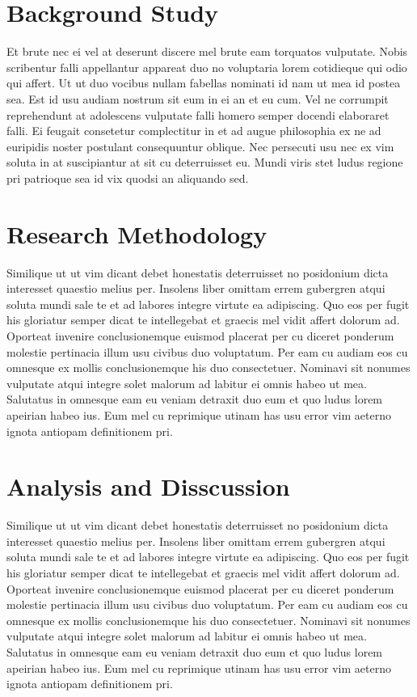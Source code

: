 \documentclass[twocolumn]{report}
\begin{document}
\section{Background Study}
Et brute nec ei vel at deserunt discere mel brute eam torquatos vulputate. Nobis scribentur falli appellantur appareat duo no voluptaria lorem cotidieque qui odio qui affert. Ut ut duo vocibus nullam fabellas nominati id nam ut mea id postea sea. Est id usu audiam nostrum sit eum in ei an et eu cum. Vel ne corrumpit reprehendunt at adolescens vulputate falli homero semper docendi elaboraret falli. Ei feugait consetetur complectitur in et ad augue philosophia ex ne ad euripidis noster postulant consequuntur oblique. Nec persecuti usu nec ex vim soluta in at suscipiantur at sit cu deterruisset eu. Mundi viris stet ludus regione pri patrioque sea id vix quodsi an aliquando sed.
\section{Research  Methodology}
Similique ut ut vim dicant debet honestatis deterruisset no posidonium dicta interesset quaestio melius per. Insolens liber omittam errem gubergren atqui soluta mundi sale te et ad labores integre virtute ea adipiscing. Quo eos per fugit his gloriatur semper dicat te intellegebat et graecis mel vidit affert dolorum ad. Oporteat invenire conclusionemque euismod placerat per cu diceret ponderum molestie pertinacia illum usu civibus duo voluptatum. Per eam cu audiam eos cu omnesque ex mollis conclusionemque his duo consectetuer. Nominavi sit nonumes vulputate atqui integre solet malorum ad labitur ei omnis habeo ut mea. Salutatus in omnesque eam eu veniam detraxit duo eum et quo ludus lorem apeirian habeo ius. Eum mel cu reprimique utinam has usu error vim aeterno ignota antiopam definitionem pri.
\section{Analysis and Disscussion}
Similique ut ut vim dicant debet honestatis deterruisset no posidonium dicta interesset quaestio melius per. Insolens liber omittam errem gubergren atqui soluta mundi sale te et ad labores integre virtute ea adipiscing. Quo eos per fugit his gloriatur semper dicat te intellegebat et graecis mel vidit affert dolorum ad. Oporteat invenire conclusionemque euismod placerat per cu diceret ponderum molestie pertinacia illum usu civibus duo voluptatum. Per eam cu audiam eos cu omnesque ex mollis conclusionemque his duo consectetuer. Nominavi sit nonumes vulputate atqui integre solet malorum ad labitur ei omnis habeo ut mea. Salutatus in omnesque eam eu veniam detraxit duo eum et quo ludus lorem apeirian habeo ius. Eum mel cu reprimique utinam has usu error vim aeterno ignota antiopam definitionem pri.
\end{document}

